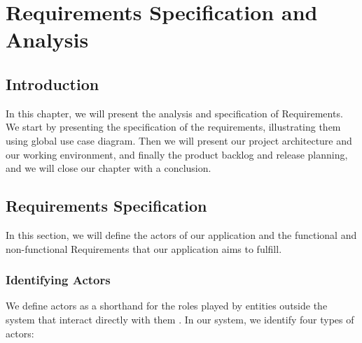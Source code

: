\chapter{Requirements Specification and Analysis}

\section*{Introduction}

  In this chapter, we will present the analysis and specification of Requirements. We start by presenting the specification of the requirements, illustrating them using global use case diagram. Then we will present our project architecture and our working environment, and finally the product backlog and release planning, and we will close our chapter with a conclusion.

\section{Requirements Specification}

In this section, we will define the actors of our application and the functional and non-functional Requirements that our application aims to fulfill.

\subsection{Identifying Actors}

We define actors as a shorthand for the roles played by entities outside the system that interact directly with them \cite{CockburnUML2002, CockburnWritingEffectiveUseCases2000}. In our system, we identify four types of actors:

